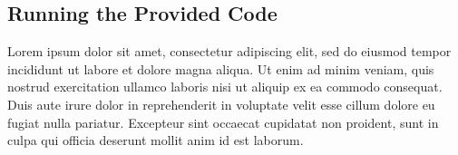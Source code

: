 \documentclass[twoside,12pt,a4paper]{article}
\begin{document}
\subsection{Running the Provided Code}
Lorem ipsum dolor sit amet, consectetur adipiscing elit, sed do eiusmod tempor incididunt ut labore et dolore magna aliqua. Ut enim ad minim veniam, quis nostrud exercitation ullamco laboris nisi ut aliquip ex ea commodo consequat. Duis aute irure dolor in reprehenderit in voluptate velit esse cillum dolore eu fugiat nulla pariatur. Excepteur sint occaecat cupidatat non proident, sunt in culpa qui officia deserunt mollit anim id est laborum.

\clearpage
\end{document}
